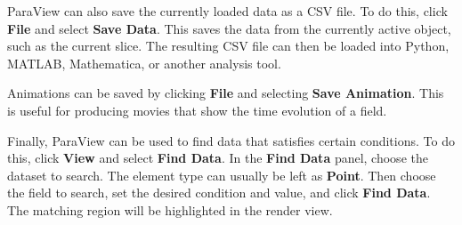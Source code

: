 ParaView can also save the currently loaded data as a CSV file. To do this,
click \textbf{File} and select \textbf{Save Data}. This saves the data from the
currently active object, such as the current slice. The resulting CSV file can
then be loaded into Python, MATLAB, Mathematica, or another analysis tool.

Animations can be saved by clicking \textbf{File} and selecting
\textbf{Save Animation}. This is useful for producing movies that show the time
evolution of a field.

Finally, ParaView can be used to find data that satisfies certain conditions.
To do this, click \textbf{View} and select \textbf{Find Data}. In the
\textbf{Find Data} panel, choose the dataset to search. The element type can
usually be left as \textbf{Point}. Then choose the field to search, set the
desired condition and value, and click \textbf{Find Data}. The matching region
will be highlighted in the render view.
